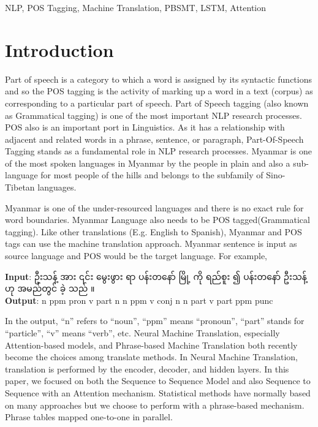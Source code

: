 \documentclass[conference]{IEEEtran}
\newcommand{\quotes}[1]{``#1''}
\begin{document}
\begin{IEEEkeywords}
NLP, POS Tagging, Machine Translation, PBSMT, LSTM, Attention
\end{IEEEkeywords}

\section{Introduction}
Part of speech is a category to which a word is assigned by its syntactic functions and so the POS tagging is the activity of marking up a word in a text (corpus) as corresponding to a particular part of speech. Part of Speech tagging (also known as Grammatical tagging) is one of the most important NLP research processes. POS also is an important port in Linguistics. As it has a relationship with adjacent and related words in a phrase, sentence, or paragraph, Part-Of-Speech Tagging stands as a fundamental role in NLP research processes. Myanmar is one of the most spoken languages in Myanmar by the people in plain and also a sub-language for most people of the hills and belongs to the subfamily of Sino-Tibetan languages.

Myanmar is one of the under-resourced languages and there is no exact rule for word boundaries. Myanmar Language also needs to be POS tagged(Grammatical tagging). Like other translations (E.g. English to Spanish), Myanmar and POS tags can use the machine translation approach. Myanmar sentence is input as source language and POS would be the target language. For example,
 
\noindent \textbf{Input}: {\padauktext ဦးသန့် အား ၎င်း မွေးဖွား ရာ ပန်းတနော် မြို့ ကို ရည်စူး ၍ ပန်းတနော် ဦးသန့် ဟု အမည်တွင် ခဲ့ သည် ။}\\
\noindent \textbf{Output}: n ppm pron v part n n ppm v conj n n part v part ppm punc

In the output, \quotes{n} refers to \quotes{noun}, \quotes{ppm} means \quotes{pronoun}, \quotes{part} stands for \quotes{particle}, \quotes{v} means \quotes{verb}, etc. Neural Machine Translation, especially Attention-based models, and Phrase-based Machine Translation both recently become the choices among translate methods. In Neural Machine Translation, translation is performed by the encoder, decoder, and hidden layers. In this paper, we focused on both the Sequence to Sequence Model and also Sequence to Sequence with an Attention mechanism. Statistical methods have normally based on many approaches but we choose to perform with a phrase-based mechanism. Phrase tables mapped one-to-one in parallel. 
\end{document}
